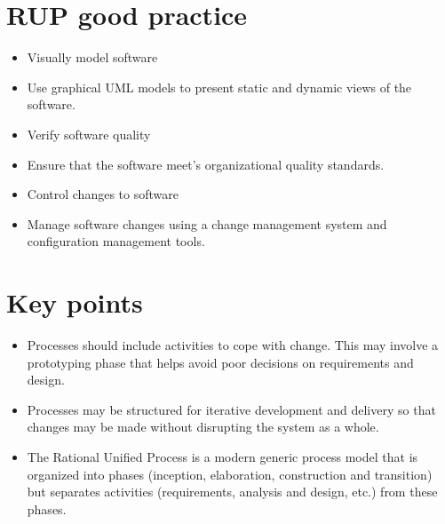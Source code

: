 \section{RUP good practice}
\begin{itemize}

\item Visually model software

\item Use graphical UML models to present static and dynamic views of the software.

\item Verify software quality

\item Ensure that the software meet’s organizational quality standards. \item Control changes to software
\item Manage software changes using a change management system and configuration management tools.
\end{itemize}

\section{Key points}
\begin{itemize}
\item Processes should include activities to cope with change. This may involve a prototyping phase that helps avoid poor decisions on requirements and design.

\item Processes may be structured for iterative development and delivery so that changes may be made without disrupting the system as a whole.

\item The Rational Unified Process is a modern generic process model that is organized into phases (inception, elaboration, construction and transition) but separates activities (requirements, analysis and design, etc.) from these phases.
\end{itemize}
